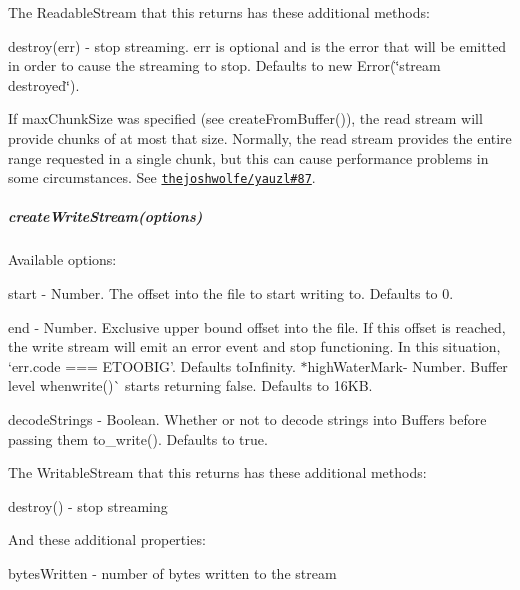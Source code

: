 The Readable\+Stream that this returns has these additional methods\+:


\begin{DoxyItemize}
\item {\ttfamily destroy(err)} -\/ stop streaming. {\ttfamily err} is optional and is the error that will be emitted in order to cause the streaming to stop. Defaults to {\ttfamily new Error(\char`\"{}stream destroyed\char`\"{})}.
\end{DoxyItemize}

If {\ttfamily max\+Chunk\+Size} was specified (see {\ttfamily create\+From\+Buffer()}), the read stream will provide chunks of at most that size. Normally, the read stream provides the entire range requested in a single chunk, but this can cause performance problems in some circumstances. See \href{https://github.com/thejoshwolfe/yauzl/issues/87}{\tt thejoshwolfe/yauzl\#87}.

\subparagraph*{create\+Write\+Stream(options)}

Available {\ttfamily options}\+:


\begin{DoxyItemize}
\item {\ttfamily start} -\/ Number. The offset into the file to start writing to. Defaults to 0.
\item {\ttfamily end} -\/ Number. Exclusive upper bound offset into the file. If this offset is reached, the write stream will emit an \textquotesingle{}error\textquotesingle{} event and stop functioning. In this situation, `err.\+code === \textquotesingle{}E\+T\+O\+O\+B\+IG'{\ttfamily . Defaults to}Infinity{\ttfamily . $\ast$}high\+Water\+Mark{\ttfamily -\/ Number. Buffer level when}write()\`{} starts returning false. Defaults to 16\+KB.
\item {\ttfamily decode\+Strings} -\/ Boolean. Whether or not to decode strings into Buffers before passing them to{\ttfamily \+\_\+write()}. Defaults to {\ttfamily true}.
\end{DoxyItemize}

The Writable\+Stream that this returns has these additional methods\+:


\begin{DoxyItemize}
\item {\ttfamily destroy()} -\/ stop streaming
\end{DoxyItemize}

And these additional properties\+:


\begin{DoxyItemize}
\item {\ttfamily bytes\+Written} -\/ number of bytes written to the stream
\end{DoxyItemize}

